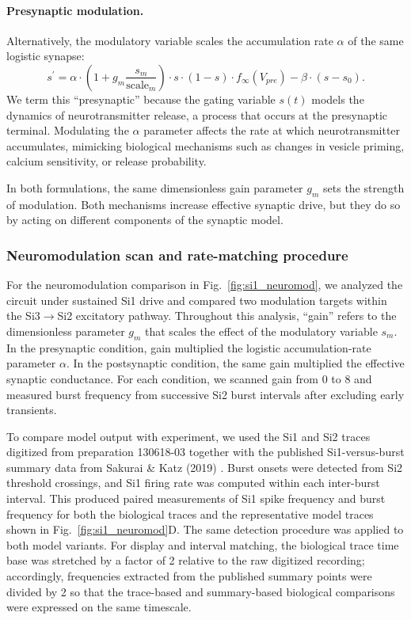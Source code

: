 \paragraph{Presynaptic modulation.}
Alternatively, the modulatory variable scales the accumulation rate $\alpha$ of the same logistic synapse:
\begin{equation}
{s}^\prime = \alpha \cdot \left(1 + g_m \frac{s_m}{\text{scale}_m}\right) \cdot s \cdot (1-s) \cdot f_{\infty}(V_{pre}) - \beta \cdot (s - s_0).
\end{equation}
We term this ``presynaptic'' because the gating variable $s(t)$ models the dynamics of neurotransmitter release, a process that occurs at the presynaptic terminal.
Modulating the $\alpha$ parameter affects the rate at which neurotransmitter accumulates, mimicking biological mechanisms such as changes in vesicle priming, calcium sensitivity, or release probability.

In both formulations, the same dimensionless gain parameter $g_m$ sets the strength of modulation.
Both mechanisms increase effective synaptic drive, but they do so by acting on different components of the synaptic model.

\subsubsection*{Neuromodulation scan and rate-matching procedure}

For the neuromodulation comparison in Fig.~\ref{fig:si1_neuromod}, we analyzed the circuit under sustained Si1 drive and compared two modulation targets within the Si3$\to$Si2 excitatory pathway.
Throughout this analysis, ``gain'' refers to the dimensionless parameter $g_m$ that scales the effect of the modulatory variable $s_m$.
In the presynaptic condition, gain multiplied the logistic accumulation-rate parameter $\alpha$.
In the postsynaptic condition, the same gain multiplied the effective synaptic conductance.
For each condition, we scanned gain from 0 to 8 and measured burst frequency from successive Si2 burst intervals after excluding early transients.

To compare model output with experiment, we used the Si1 and Si2 traces digitized from preparation 130618-03 together with the published Si1-versus-burst summary data from Sakurai \& Katz (2019) \cite{sakurai2019command}.
Burst onsets were detected from Si2 threshold crossings, and Si1 firing rate was computed within each inter-burst interval.
This produced paired measurements of Si1 spike frequency and burst frequency for both the biological traces and the representative model traces shown in Fig.~\ref{fig:si1_neuromod}D.
The same detection procedure was applied to both model variants.
For display and interval matching, the biological trace time base was stretched by a factor of 2 relative to the raw digitized recording; accordingly, frequencies extracted from the published summary points were divided by 2 so that the trace-based and summary-based biological comparisons were expressed on the same timescale.


